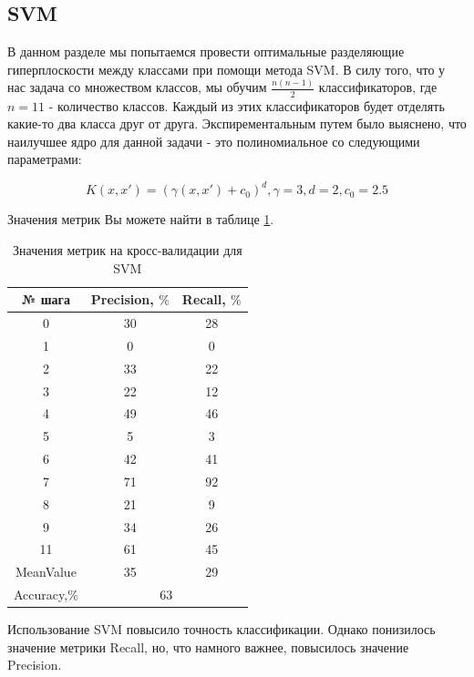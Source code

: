 \documentclass[12pt]{article}
\begin{document}
\subsection{SVM}

В данном разделе мы попытаемся провести оптимальные разделяющие гиперплоскости между классами при помощи метода SVM. В силу того, что у нас задача со множеством классов, мы обучим $\frac{n(n-1)}{2}$ классификаторов, где $n=11$ - количество классов. Каждый из этих классификаторов будет отделять какие-то два класса друг от друга. Экспирементальным путем было выяснено, что наилучшее ядро для данной задачи - это полиномиальное со следующими параметрами:

\begin{equation}
K(x,x') = \left(\gamma(x,x')+c_0\right)^d,\gamma = 3,d=2,c_0 = 2.5
\end{equation}

Значения метрик Вы можете найти в таблице \ref{table:SVM}.

\begin{table}[h!]
\centering
\begin{tabular}{||c|c|c||}
\hline
№ шага &  Precision, $\%$ &Recall, $\%$ \\
\hline
0 &	30 &	28 \\
\hline
1 &	0 &	0 \\
\hline
2&	33 &	22 \\
\hline
3 &	22 &	12 \\
\hline
4 &	49 &	46 \\
\hline
5 &	5 &	3 \\
\hline
6 &	42 & 41 \\
\hline
7 &	71 &	92 \\
\hline
8 &	21 &	9 \\
\hline
9 &	34 &	26 \\
\hline
11 &	61 &	45 \\
\hline
MeanValue&35&29\\
\hline
Accuracy,$\%$&  \multicolumn{2}{c|}{63}\\
\hline
\end{tabular}
\caption{Значения метрик на кросс-валидации для SVM}
\label{table:SVM}
\end{table}

Использование SVM повысило точность классификации. Однако понизилось значение  метрики Recall, но, что намного важнее, повысилось значение Precision.
\end{document}

